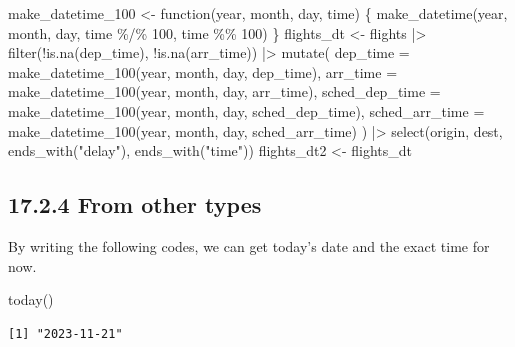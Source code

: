 \documentclass[
  letterpaper,
  DIV=11,
  numbers=noendperiod]{scrartcl}
\newenvironment{Shaded}{\begin{snugshade}}{\end{snugshade}}
\newcommand{\AttributeTok}[1]{\textcolor[rgb]{0.40,0.45,0.13}{#1}}
\newcommand{\ControlFlowTok}[1]{\textcolor[rgb]{0.00,0.23,0.31}{#1}}
\newcommand{\DecValTok}[1]{\textcolor[rgb]{0.68,0.00,0.00}{#1}}
\newcommand{\FunctionTok}[1]{\textcolor[rgb]{0.28,0.35,0.67}{#1}}
\newcommand{\NormalTok}[1]{\textcolor[rgb]{0.00,0.23,0.31}{#1}}
\newcommand{\OtherTok}[1]{\textcolor[rgb]{0.00,0.23,0.31}{#1}}
\newcommand{\SpecialCharTok}[1]{\textcolor[rgb]{0.37,0.37,0.37}{#1}}
\newcommand{\StringTok}[1]{\textcolor[rgb]{0.13,0.47,0.30}{#1}}
\begin{document}
\begin{Shaded}
\begin{Highlighting}[]
\NormalTok{make\_datetime\_100 }\OtherTok{\textless{}{-}} \ControlFlowTok{function}\NormalTok{(year, month, day, time) \{}
  \FunctionTok{make\_datetime}\NormalTok{(year, month, day, time }\SpecialCharTok{\%/\%} \DecValTok{100}\NormalTok{, time }\SpecialCharTok{\%\%} \DecValTok{100}\NormalTok{)}
\NormalTok{  \} }
\NormalTok{flights\_dt }\OtherTok{\textless{}{-}}\NormalTok{ flights }\SpecialCharTok{|\textgreater{}}
  \FunctionTok{filter}\NormalTok{(}\SpecialCharTok{!}\FunctionTok{is.na}\NormalTok{(dep\_time), }\SpecialCharTok{!}\FunctionTok{is.na}\NormalTok{(arr\_time)) }\SpecialCharTok{|\textgreater{}}
  \FunctionTok{mutate}\NormalTok{(}
    \AttributeTok{dep\_time =} \FunctionTok{make\_datetime\_100}\NormalTok{(year, month, day, dep\_time),}
    \AttributeTok{arr\_time =} \FunctionTok{make\_datetime\_100}\NormalTok{(year, month, day, arr\_time),}
    \AttributeTok{sched\_dep\_time =} \FunctionTok{make\_datetime\_100}\NormalTok{(year, month, day, sched\_dep\_time),}
    \AttributeTok{sched\_arr\_time =} \FunctionTok{make\_datetime\_100}\NormalTok{(year, month, day, sched\_arr\_time)}
\NormalTok{    ) }\SpecialCharTok{|\textgreater{}}    
  \FunctionTok{select}\NormalTok{(origin, dest, }\FunctionTok{ends\_with}\NormalTok{(}\StringTok{"delay"}\NormalTok{), }\FunctionTok{ends\_with}\NormalTok{(}\StringTok{"time"}\NormalTok{))}
\NormalTok{flights\_dt2 }\OtherTok{\textless{}{-}}\NormalTok{ flights\_dt}
\end{Highlighting}
\end{Shaded}

\hypertarget{from-other-types}{%
\subsection{\texorpdfstring{17.2.4 \textbf{From other
types}}{17.2.4 From other types}}\label{from-other-types}}

By writing the following codes, we can get today's date and the exact
time for now.

\begin{Shaded}
\begin{Highlighting}[]
\FunctionTok{today}\NormalTok{() }
\end{Highlighting}
\end{Shaded}

\begin{verbatim}
[1] "2023-11-21"
\end{verbatim}
\end{document}
